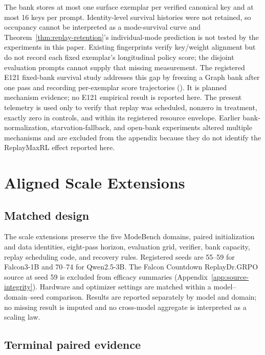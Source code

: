 \documentclass{article}
\newcommand{\1}{\mathbf 1}
\theoremstyle{remark}
\theoremstyle{definition}
\theoremstyle{plain}
\begin{document}
The bank stores at most one surface exemplar per verified canonical key and at
most 16 keys per prompt. Identity-level survival histories were not retained,
so occupancy cannot be interpreted as a mode-survival curve and
Theorem~\ref{thm:replay-retention}'s individual-mode prediction is not tested by
the experiments in this paper. Existing fingerprints verify key/weight
alignment but do not record each fixed exemplar's longitudinal policy score;
the disjoint evaluation prompts cannot supply that missing measurement. The
registered E121 fixed-bank survival study addresses this gap by freezing a
Graph bank after one pass and recording per-exemplar score trajectories
().
It is planned mechanism evidence; no E121 empirical result is reported here.
The present telemetry is used only to verify that
replay was scheduled, nonzero in treatment, exactly zero in controls, and
within its registered resource envelope. Earlier
bank-normalization, starvation-fallback, and open-bank experiments altered
multiple mechanisms and are excluded from the appendix because they do not
identify the ReplayMaxRL effect reported here.

\section{Aligned Scale Extensions}
\label{app:aligned-xmode}

\subsection{Matched design}
\label{app:scale-matrix}

The scale extensions preserve the five ModeBench domains, paired initialization
and data identities, eight-pass horizon, evaluation grid, verifier, bank
capacity, replay scheduling code, and recovery rules. Registered seeds are
55--59 for Falcon3-1B and 70--74 for Qwen2.5-3B. The Falcon Countdown
ReplayDr.GRPO source at seed 59 is excluded from efficacy summaries
(Appendix~\ref{app:source-integrity}). Hardware and optimizer settings are matched
within a model--domain--seed comparison. Results are reported separately by
model and domain; no missing result is imputed and no cross-model aggregate
is interpreted as a scaling law.

\subsection{Terminal paired evidence}
\label{app:scale-snapshot}
\end{document}
